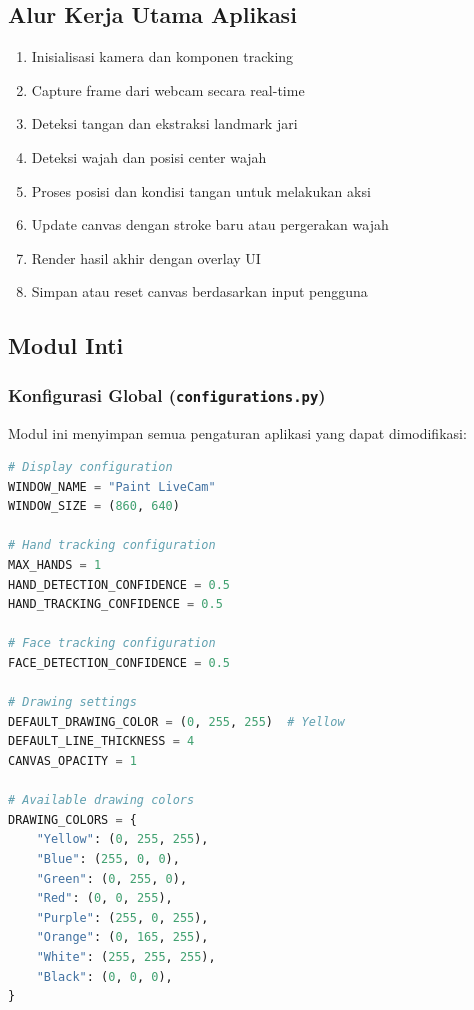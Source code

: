 \documentclass[11pt,a4paper]{article}
\begin{document}
\subsection{Alur Kerja Utama Aplikasi}
\begin{enumerate}
\item Inisialisasi kamera dan komponen tracking
\item Capture frame dari webcam secara real-time
\item Deteksi tangan dan ekstraksi landmark jari
\item Deteksi wajah dan posisi center wajah
\item Proses posisi dan kondisi tangan untuk melakukan aksi
\item Update canvas dengan stroke baru atau pergerakan wajah
\item Render hasil akhir dengan overlay UI
\item Simpan atau reset canvas berdasarkan input pengguna
\end{enumerate}

\subsection{Modul Inti}
\subsubsection{Konfigurasi Global (\texttt{configurations.py})}
Modul ini menyimpan semua pengaturan aplikasi yang dapat dimodifikasi:

\begin{lstlisting}[language=Python, caption=Konfigurasi utama aplikasi]
# Display configuration
WINDOW_NAME = "Paint LiveCam"
WINDOW_SIZE = (860, 640)

# Hand tracking configuration
MAX_HANDS = 1
HAND_DETECTION_CONFIDENCE = 0.5
HAND_TRACKING_CONFIDENCE = 0.5

# Face tracking configuration
FACE_DETECTION_CONFIDENCE = 0.5

# Drawing settings
DEFAULT_DRAWING_COLOR = (0, 255, 255)  # Yellow
DEFAULT_LINE_THICKNESS = 4
CANVAS_OPACITY = 1

# Available drawing colors
DRAWING_COLORS = {
    "Yellow": (0, 255, 255),
    "Blue": (255, 0, 0),
    "Green": (0, 255, 0),
    "Red": (0, 0, 255),
    "Purple": (255, 0, 255),
    "Orange": (0, 165, 255),
    "White": (255, 255, 255),
    "Black": (0, 0, 0),
}
\end{lstlisting}
\end{document}
